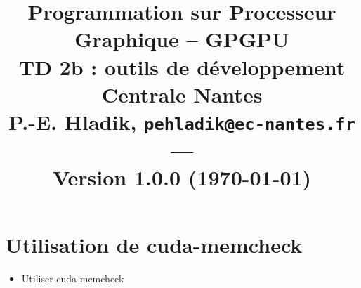 

\title{{\Large Programmation sur Processeur Graphique -- GPGPU }\\
\vspace{-0.4em}
{\large TD 2b : outils de développement}\\
{\small Centrale Nantes}\\
\small P.-E. Hladik, \small{\texttt{pehladik@ec-nantes.fr}}\\
---\\
{\scriptsize  Version 1.0.0 (\today)}\\
}



\maketitle


  \section{Utilisation de cuda-memcheck}

\begin{objectif}[]{}
 \begin{itemize}
	\item Utiliser cuda-memcheck
\end{itemize}
\end{objectif}

